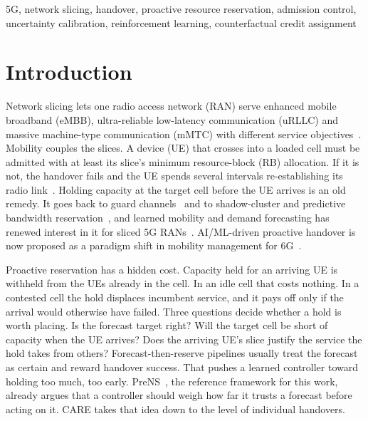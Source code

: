 \documentclass[conference]{IEEEtran}
\begin{document}
\begin{IEEEkeywords}
5G, network slicing, handover, proactive resource reservation, admission control, uncertainty calibration, reinforcement learning, counterfactual credit assignment
\end{IEEEkeywords}

\section{Introduction}
Network slicing lets one radio access network (RAN) serve enhanced mobile broadband (eMBB), ultra-reliable low-latency communication (uRLLC) and massive machine-type communication (mMTC) with different service objectives~\cite{foukas2017slicing,afolabi2018slicing,3gpp28541}. Mobility couples the slices. A device (UE) that crosses into a loaded cell must be admitted with at least its slice's minimum resource-block (RB) allocation. If it is not, the handover fails and the UE spends several intervals re-establishing its radio link~\cite{3gpp38300}. Holding capacity at the target cell before the UE arrives is an old remedy. It goes back to guard channels~\cite{hong1986guard} and to shadow-cluster and predictive bandwidth reservation~\cite{levine1997shadow,choi1998predictive}, and learned mobility and demand forecasting has renewed interest in it for sliced 5G RANs~\cite{wu2026prens,li2020mobility,bega2020deepcog,gharehgoli2023uncertainty,phyu2023mlslicing}. AI/ML-driven proactive handover is now proposed as a paradigm shift in mobility management for 6G~\cite{park2024proactive}.

Proactive reservation has a hidden cost. Capacity held for an arriving UE is withheld from the UEs already in the cell. In an idle cell that costs nothing. In a contested cell the hold displaces incumbent service, and it pays off only if the arrival would otherwise have failed. Three questions decide whether a hold is worth placing. Is the forecast target right? Will the target cell be short of capacity when the UE arrives? Does the arriving UE's slice justify the service the hold takes from others? Forecast-then-reserve pipelines usually treat the forecast as certain and reward handover success. That pushes a learned controller toward holding too much, too early. PreNS~\cite{wu2026prens}, the reference framework for this work, already argues that a controller should weigh how far it trusts a forecast before acting on it. CARE takes that idea down to the level of individual handovers.
\end{document}
